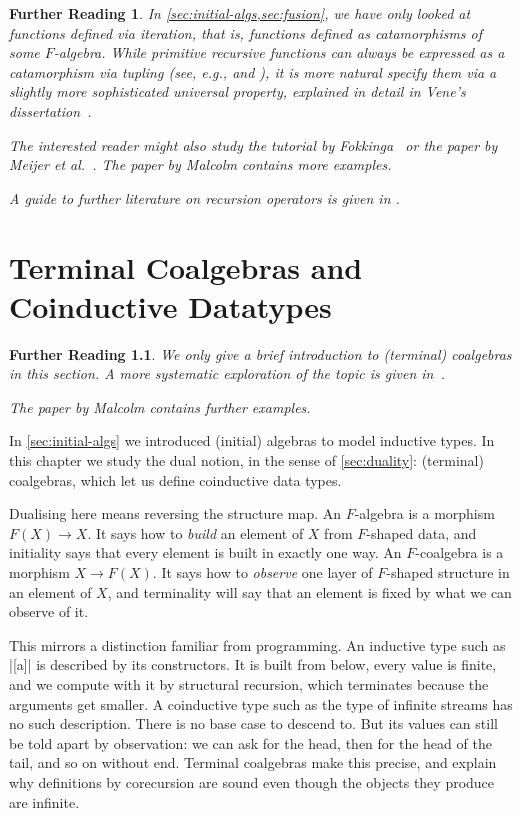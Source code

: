 \documentclass[a4paper,11pt, oneside,titlepage=false]{scrbook}
\theoremstyle{plain}
\newtheorem*{reading*}{Further Reading}
\theoremstyle{definition}
\begin{document}
\begin{reading*}
  In \cref{sec:initial-algs,sec:fusion}, we have only looked at functions defined via \emph{iteration}, that is, functions defined as \emph{catamorphisms} of some $F$-algebra.
  While \emph{primitive recursive} functions can always be expressed as a catamorphism via tupling (see, e.g., \cite[\S4]{DBLP:journals/jfp/Hutton99} and \cite[\S3.1]{vene_phd}), it is more natural specify them via a slightly more sophisticated universal property, explained in detail in Vene's dissertation~\cite[Chapter~3]{vene_phd}.

  The interested reader might also study the tutorial by Fokkinga~\cite{Fokkinga_homo-cata} or the paper by Meijer et al.~\cite{DBLP:conf/fpca/MeijerFP91}.
  The paper \cite{DBLP:journals/scp/Malcolm90} by Malcolm contains more examples.

  A guide to further literature on recursion operators is given in \cite[\S6]{DBLP:journals/jfp/Hutton99}.
\end{reading*}

\chapter{Terminal Coalgebras and Coinductive Datatypes}\label{sec:coinductive}


\begin{reading*}
  We only give a brief introduction to (terminal) coalgebras in this section.
  A more systematic exploration of the topic is given in~\cite{DBLP:conf/fpca/MeijerFP91}.

  The paper \cite{DBLP:journals/scp/Malcolm90} by Malcolm contains further examples.
\end{reading*}

In \cref{sec:initial-algs} we introduced (initial) algebras to model inductive
types.
In this chapter we study the dual notion, in the sense of \cref{sec:duality}:
(terminal) coalgebras, which let us define coinductive data types.

Dualising here means reversing the structure map.
An $F$-algebra is a morphism $F(X) \to X$.
It says how to \emph{build} an element of $X$ from $F$-shaped data, and
initiality says that every element is built in exactly one way.
An $F$-coalgebra is a morphism $X \to F(X)$.
It says how to \emph{observe} one layer of $F$-shaped structure in an element
of $X$, and terminality will say that an element is fixed by what we can
observe of it.

This mirrors a distinction familiar from programming.
An inductive type such as |[a]| is described by its constructors.
It is built from below, every value is finite, and we compute with it by
structural recursion, which terminates because the arguments get smaller.
A coinductive type such as the type of infinite streams has no such
description.
There is no base case to descend to.
But its values can still be told apart by observation: we can ask for the head,
then for the head of the tail, and so on without end.
Terminal coalgebras make this precise, and explain why definitions by
corecursion are sound even though the objects they produce are infinite.
\end{document}
